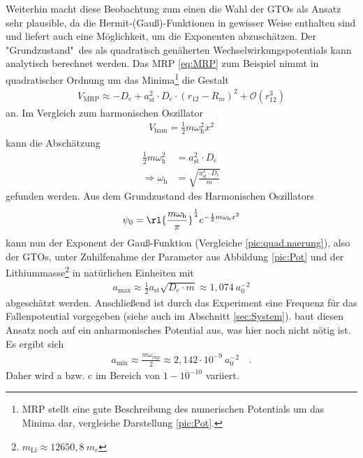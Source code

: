 Weiterhin macht diese Beobachtung zum einen die Wahl der GTOs als Ansatz sehr 
plausible, da die Hermit-(Gauß)-Funktionen in gewisser 
Weise enthalten sind und liefert auch eine Möglichkeit, 
um die Exponenten abzuschätzen. Der "Grundzustand"\ des 
als quadratisch genäherten Wechselwirkungspotentials 
kann analytisch berechnet werden. Das MRP \ref{eq:MRP} zum Beispiel nimmt in 
quadratischer 
Ordnung um das Minima\footnote{MRP stellt eine gute Beschreibung des 
numerischen Potentials um das Minima dar, vergleiche Darstellung 
\ref{pic:Pot}.} die Gestalt
%
\begin{align*}
V_\text{MRP}\approx-D_e + a_\text{st}^2\cdot D_e\cdot (r_{12}-R_m)^2 + 
\mathcal{O}(r_{12}^3) 
\end{align*}
%
an. Im Vergleich zum harmonischen Oszillator
%
\begin{align*}
V_\text{ham}=\frac12 m\omega_\text{h}^2 x^2
\end{align*}
% 
kann die Abschätzung
%
\begin{align*}
\frac12 m \omega_\text{h}^2 &= a_\text{st}^2 \cdot D_e\\
\Rightarrow \omega_\text{h}&=\sqrt{\frac{a_\text{st}^2\cdot D_e}{m}}
\end{align*}
%
gefunden werden. Aus dem Grundzustand des Harmonischen Oszillators 
%
\begin{align*}
\psi_0=\rl{\frac{m\omega_\text{h}}{\pi}}^\frac14 e^{-\frac12 m\omega_\text{h} 
x^2}
\end{align*}
%
kann nun der Exponent der Gauß-Funktion (Vergleiche \ref{pic:quad.naerung}), 
also der GTOs, 
unter Zuhilfenahme der Parameter aus Abbildung \ref{pic:Pot} und der 
Lithiummasse\footnote{$m_\text{Li}\approx12650,8 \ m_e$} in 
natürlichen Einheiten mit
%
\begin{align}
a_\text{max}\approx\frac{1}{2}a_\text{st}\sqrt{D_e\cdot m}\approx 1,074\  
a_0^{-2}
\end{align}
%
abgeschätzt werden.
Anschließend ist durch das Experiment \cite{av:7a} eine 
Frequenz für das Fallenpotential vorgegeben (siehe auch im Abschnitt 
\ref{sec:System}). 
\cite{phdthesis:sala} baut diesen Ansatz noch auf ein 
anharmonisches Potential aus, was hier noch nicht nötig 
ist. Es ergibt sich
%
\begin{align*}
a_\text{min}\approx\frac{m\omega_\text{exp}}{2}\approx2,142\cdot 10^{-9} \ 
a_0^{-2}\quad.
\end{align*}
%
Daher wird a bzw. c im Bereich von $1-10^{-10}$ 
variiert. 
%
